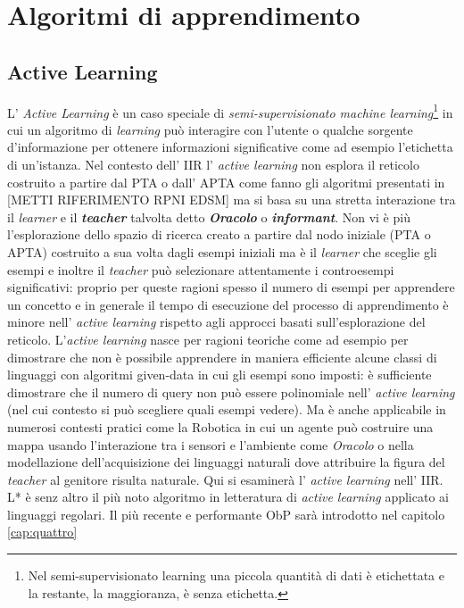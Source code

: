 
\chapter[Algoritmi d'apprendimento]{Algoritmi di apprendimento} %
\label{cap:tre}
\section{Active Learning}
L' \textit{Active Learning} è un caso speciale di \textit{semi-supervisionato machine learning}\footnote{Nel semi-supervisionato learning una piccola quantità di dati è etichettata e la restante, la maggioranza, è senza etichetta.} in cui un algoritmo di \textit{learning} può interagire con l'utente o  qualche sorgente d'informazione per ottenere informazioni significative come ad esempio l'etichetta di un'istanza. Nel contesto dell' \ac{IIR} l' \textit{active learning} non esplora il reticolo costruito a partire dal PTA o dall' APTA come fanno gli algoritmi presentati in [METTI RIFERIMENTO RPNI EDSM]   ma si basa su una stretta interazione tra il \textit{learner} e il \textit{\textbf{teacher}} talvolta detto \textit{\textbf{Oracolo}} o \textit{\textbf{informant}}. Non vi è più l'esplorazione dello spazio di ricerca creato a partire dal nodo iniziale (PTA o APTA) costruito a sua volta dagli esempi iniziali ma è il \textit{learner} che sceglie gli esempi e inoltre  il \textit{teacher} può selezionare attentamente i controesempi significativi: proprio per queste ragioni spesso il numero di esempi per apprendere un concetto e in generale il tempo di esecuzione del processo di apprendimento è minore nell' \textit{active learning} rispetto agli approcci basati sull'esplorazione del reticolo.
L'\textit{active learning} nasce per ragioni teoriche come ad esempio per dimostrare che non è possibile apprendere in maniera efficiente alcune classi di linguaggi con algoritmi given-data in cui gli esempi sono imposti: è sufficiente dimostrare che il numero di query non può essere polinomiale nell' \textit{active learning} (nel cui contesto si può scegliere quali esempi vedere). Ma è anche applicabile in numerosi contesti pratici come la Robotica in cui un agente può costruire una mappa usando l'interazione tra i sensori e l'ambiente come \textit{Oracolo} o nella modellazione dell'acquisizione dei linguaggi naturali dove attribuire la figura del \textit{teacher} al genitore risulta naturale. Qui si esaminerà l' \textit{active learning} nell' \ac{IIR}. L* è senz altro il più noto algoritmo in letteratura di \textit{active learning} applicato ai linguaggi regolari. Il più recente e performante \ac{ObP} sarà introdotto nel capitolo \ref{cap:quattro}
